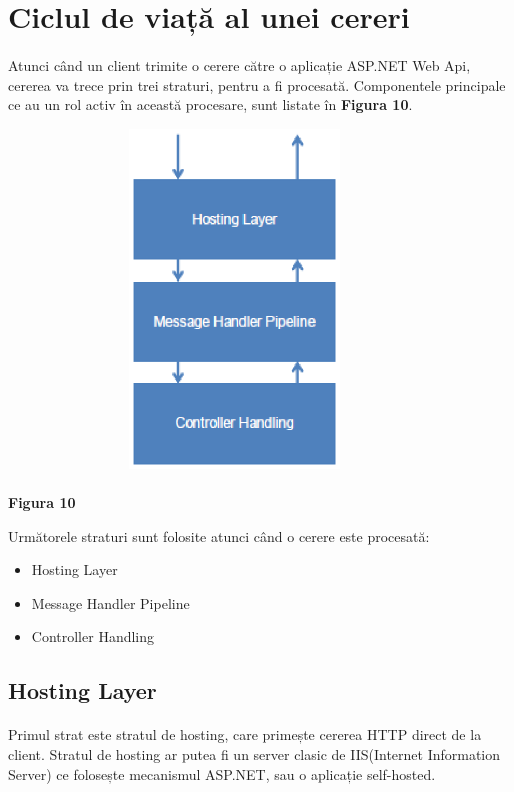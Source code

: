 \section{Ciclul de viață al unei cereri}

\paragraph{} Atunci când un client trimite o cerere către o aplicație ASP.NET Web Api, cererea va trece prin trei straturi, pentru a fi procesată. Componentele principale ce au un rol activ în această procesare, sunt listate în \textbf{Figura 10}.

\begin{center}
\includegraphics[width=12cm,height=9cm,keepaspectratio]{imagini/CicluCerere.eps} %
\paragraph{}
\textbf{Figura 10}
\end{center}

Următorele straturi sunt folosite atunci când o cerere este procesată:
\begin{itemize}
\item Hosting Layer
\item Message Handler Pipeline
\item Controller Handling
\end{itemize}

\subsection{Hosting Layer}
\paragraph{} Primul strat este stratul de hosting, care primește cererea HTTP direct de la client. Stratul de hosting ar putea fi un server clasic de IIS(Internet Information Server) ce folosește mecanismul ASP.NET, sau o aplicație self-hosted.

